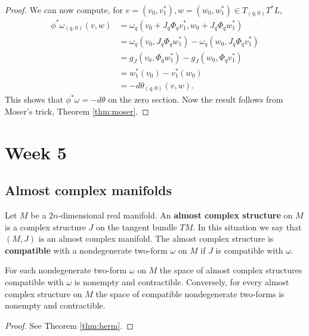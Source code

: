 \documentclass{amsart}
\begin{document}
\begin{proof}
    We can now compute, for $v=(v_0,v_1^*),w=(w_0,w_1^*)\in T_{(q,0)}T^*L$,
    \begin{align*}
        \phi^*\omega_{(q,0)}(v,w) &= \omega_q\left( v_0+J_q\Phi_qv_1^*, w_0+J_q\Phi_qw_1^* \right)\\
        &= \omega_q(v_0,J_q\Phi_qw_1^*)-\omega_q(w_0,J_q\Phi_qv_1^*)\\
        &= g_J(v_0,\Phi_qw_1^*) - g_J(w_0,\Phi_qv_1^*)\\
        &= w_1^*(v_0) - v_1^*(w_0)\\
        &= -d\theta_{(q,0)}(v,w).
    \end{align*}
    This shows that $\phi^*\omega=-d\theta$ on the zero section. Now the result follows
    from Moser's trick, Theorem \ref{thm:moser}.
\end{proof}

\newpage
\section{Week 5}

\subsection{Almost complex manifolds}
\begin{definition}
    Let $M$ be a $2n$-dimensional real manifold. An \textbf{almost complex structure} on
    $M$ is a complex structure $J$ on the tangent bundle $TM$.
    In this situation  we say that $(M,J)$ is an almost complex manifold.
    The almost complex structure
    is \textbf{compatible} with a nondegenerate two-form $\omega$ on $M$ if $J$ is compatible 
    with $\omega$.
\end{definition}

\begin{theorem}
    For each nondegenerate two-form $\omega$ on $M$ the space of almost complex structures
    compatible with $\omega$ is nonempty and contractible. Conversely, for every almost
    complex structure on $M$ the space of compatible nondegenerate two-forms is nonempty
    and contractible.
\end{theorem}
\begin{proof}
    See Theorem \ref{thm:herm}.
\end{proof}
\end{document}

